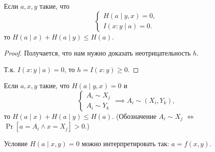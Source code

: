 \documentclass[12pt]{article}
\begin{document}
\begin{statement}
    Если $a,x,y$ такие, что
\[
    \begin{cases}
        H(a\mid y,x) = 0,\\
        I(x:y\mid a) = 0.
    \end{cases}
\]
то  \(H(a\mid x) + H(a\mid y) \le H(a)\).
\end{statement}
\begin{proof}
    Получается, что нам нужно доказать неотрицательность $h$. 
    \begin{center}
    \end{center}
Т.к. $I(x:y\mid a) = 0$, то $h = I(x:y)\ge 0$.
\end{proof}
\begin{statement}
    Если $a,x,y$ такие, что $H(a\mid y,x) = 0$ и
\[
    \begin{cases}
        A_i \sim X_j\\
        A_i \sim Y_k
    \end{cases} \implies A_i\sim(X_i,Y_k),
\]
то  \(H(a\mid x) + H(a\mid y) \le H(a)\). (Обозначение $A_i\sim X_j$ $\iff$ $\Pr[a=A_i \land x=X_j]>0$.)
\end{statement}
\begin{remark}
    Условие $H(a\mid x,y) = 0$ можно интерпретировать так: $a = f(x,y)$.
\end{remark}
\end{document}
